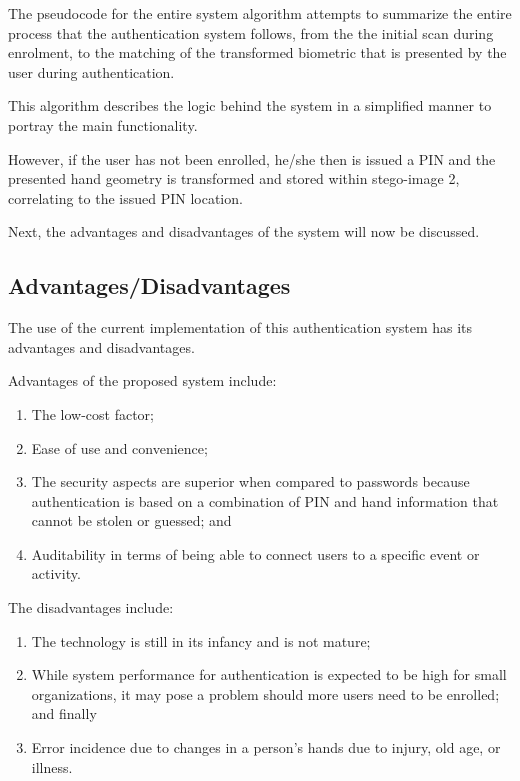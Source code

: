 

The pseudocode for the entire system algorithm attempts to summarize the entire process that the authentication system follows, from the the initial scan during enrolment, to the matching of the transformed biometric that is presented by the user during authentication. 

This algorithm describes the logic behind the system in a simplified manner to portray the main functionality. 



However, if the user has not been enrolled, he/she then is issued a PIN and the presented hand geometry is transformed and stored within stego-image 2, correlating to the issued PIN location.

Next, the advantages and disadvantages of the system will now be discussed.

\subsection{Advantages/Disadvantages}

The use of the current implementation of this authentication system has its advantages and disadvantages.


Advantages of the proposed system include:
    \begin{enumerate}[label=\roman*.]
        \item The low-cost factor; 
        \item Ease of use and convenience;
        \item The security aspects are superior when compared to passwords because authentication is based on a combination of PIN and hand information that cannot be stolen or guessed; and
        \item Auditability in terms of being able to connect users to a specific event or activity.
    \end{enumerate}
	
The disadvantages include: 
    \begin{enumerate}[label=\roman*.]
        \item The technology is still in its infancy and is not mature;
        \item While system performance for authentication is expected to be high for small organizations, it may pose a problem should more users need to be enrolled; and finally
        \item Error incidence due to changes in a person’s hands due to injury, old age, or illness.
    \end{enumerate}


